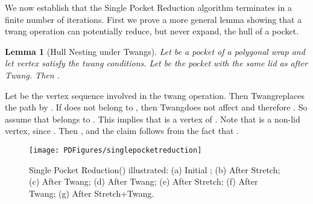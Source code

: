\pdfoutput=1  \documentclass{article}
\def\st{{\sc Stretch}}
\def\tw{{\sc Twang}}
\newtheorem{lemma}[theorem]{Lemma}
\newcommand{\lemlab}[1]{\label{lemma:#1}}
\newcommand{\figlab}[1]{\label{fig:#1}}
\newcommand{\ABox}{
\raisebox{3pt}{\framebox[6pt]{\rule{6pt}{0pt}}}
}
\newenvironment{pf}{{\bf Proof:}}{\hfill\ABox}
\begin{document}
We now establish that the {\sc Single Pocket
Reduction} algorithm terminates in a finite number of iterations. First we 
prove a
more general lemma
showing that a twang operation can potentially reduce, but never
expand, the hull of a pocket.

\begin{lemma}[Hull Nesting under Twangs]
Let  be a pocket of a polygonal wrap  and let vertex  satisfy the twang conditions.
Let  be the pocket with the
same lid as  after
\tw. Then .
\lemlab{twang.hull}
\end{lemma}


\begin{pf}
Let  be the vertex sequence involved in the twang operation.
Then \tw replaces the path  by .
If  does not belong to ,
then \tw does not affect  and therefore . So assume that
 belongs to . This implies that  is a vertex of .
Note that  is a non-lid vertex, since
. Then , and
the claim follows from the fact that .
\end{pf}

\vspace{-1.0em}
\begin{figure}[htbp]
\centering
\texttt{[image: PDFigures/singlepocketreduction]}
\vspace{-2em}\caption{\small{{\sc Single Pocket Reduction}() 
illustrated: (a) Initial ; (b) After \st;
(c) After \tw; (d) After \tw; (e) After
\st; (f) After \tw; (g) After
\st+\tw.}}
\figlab{single.pocket.reduction}
\end{figure}
\end{document}
